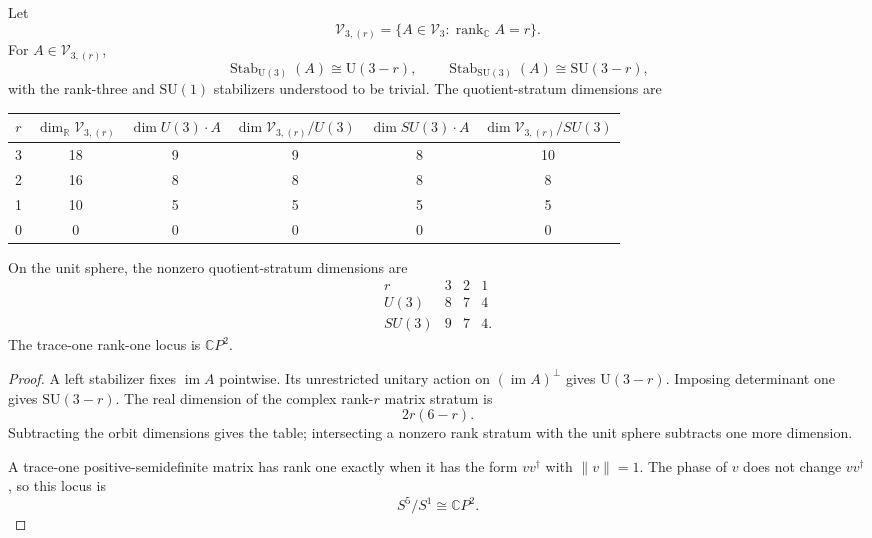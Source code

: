 \begin{proposition}
\label{prop:hr3c-rank-strata}
Let
\[
 \mathscr V_{3,(r)}
 =\{A\in\mathscr V_3:\operatorname{rank}_{\mathbb C}A=r\}.
\]
For \(A\in\mathscr V_{3,(r)}\),
\begin{equation}
 \operatorname{Stab}_{\mathrm U(3)}(A)\cong\mathrm U(3-r),
 \qquad
 \operatorname{Stab}_{\mathrm{SU}(3)}(A)\cong\mathrm{SU}(3-r),
 \label{eq:hr3c-stabilizers}
\end{equation}
with the rank-three and \(\mathrm{SU}(1)\) stabilizers understood to be
trivial.  The quotient-stratum dimensions are
\begin{center}
\begin{tabular}{c|c|c|c|c|c}
\(r\)&
\(\dim_{\mathbb R}\mathscr V_{3,(r)}\)&
\(\dim U(3)\!\cdot\!A\)&
\(\dim \mathscr V_{3,(r)}/U(3)\)&
\(\dim SU(3)\!\cdot\!A\)&
\(\dim \mathscr V_{3,(r)}/SU(3)\)\\ \hline
3&18&9&9&8&10\\
2&16&8&8&8&8\\
1&10&5&5&5&5\\
0&0&0&0&0&0
\end{tabular}
\end{center}
On the unit sphere, the nonzero quotient-stratum dimensions are
\[
 \begin{array}{c|ccc}
 r&3&2&1\\ \hline
 U(3)&8&7&4\\
 SU(3)&9&7&4.
 \end{array}
\]
The trace-one rank-one locus is \(\mathbb CP^2\).
\end{proposition}

\begin{proof}
A left stabilizer fixes \(\operatorname{im}A\) pointwise.  Its unrestricted
unitary action on \((\operatorname{im}A)^\perp\) gives
\(\mathrm U(3-r)\).  Imposing determinant one gives
\(\mathrm{SU}(3-r)\).  The real dimension of the complex rank-\(r\)
matrix stratum is
\[
 2r(6-r).
\]
Subtracting the orbit dimensions gives the table; intersecting a nonzero
rank stratum with the unit sphere subtracts one more dimension.

A trace-one positive-semidefinite matrix has rank one exactly when it has
the form \(vv^\dagger\) with \(\lVert v\rVert=1\).  The phase of \(v\)
does not change \(vv^\dagger\), so this locus is
\[
 S^5/S^1\cong\mathbb CP^2.
\]
\end{proof}

